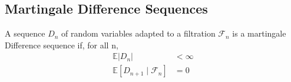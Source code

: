 \subsection{Martingale Difference Sequences}

\begin{definition} \cite*{Bartlett:2020}
  A sequence $D_n$ of random variables adapted to a filtration $\mathcal{F}_n$ is a martingale Difference sequence if, for all n,
  \begin{equation}
    \begin{aligned}
    \mathbb{E}\left|D_{n}\right| &<\infty \\
    \mathbb{E}\left[D_{n+1} \mid \mathcal{F}_{n}\right] &=0
    \end{aligned}
  \end{equation}
\end{definition}

